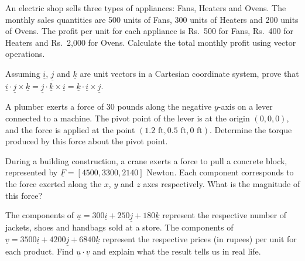 \documentclass[11pt,a4paper]{article}
\begin{document}
\begin{longlist}
\item An electric shop sells three types of appliances: Fans, Heaters and Ovens. The monthly sales quantities are 500 units of Fans, 300 units of Heaters and 200 units of Ovens. The profit per unit for each appliance is Rs.\ 500 for Fans, Rs.\ 400 for Heaters and Rs.\ 2{,}000 for Ovens. Calculate the total monthly profit using vector operations.

\item Assuming $\underline{i}$, $\underline{j}$ and $\underline{k}$ are unit vectors in a Cartesian coordinate system, prove that $\underline{i}\cdot\underline{j}\times\underline{k}= \underline{j}\cdot\underline{k}\times\underline{i}= \underline{k}\cdot\underline{i}\times\underline{j}$.

\item A plumber exerts a force of 30 pounds along the negative $y$-axis on a lever connected to a machine. The pivot point of the lever is at the origin $(0,0,0)$, and the force is applied at the point $(1.2\text{ ft}, 0.5\text{ ft}, 0\text{ ft})$. Determine the torque produced by this force about the pivot point.

\item During a building construction, a crane exerts a force to pull a concrete block, represented by $\underline{F}= [4500,3300,2140]$ Newton. Each component corresponds to the force exerted along the $x$, $y$ and $z$ axes respectively. What is the magnitude of this force?

\item The components of $\underline{u}=300\underline{i}+250\underline{j}+180\underline{k}$ represent the respective number of jackets, shoes and handbags sold at a store. The components of $\underline{v}=3500\underline{i} + 4200\underline{j} + 6840\underline{k}$ represent the respective prices (in rupees) per unit for each product. Find $\underline{u}\cdot\underline{v}$ and explain what the result tells us in real life.

\end{longlist}
\end{document}
